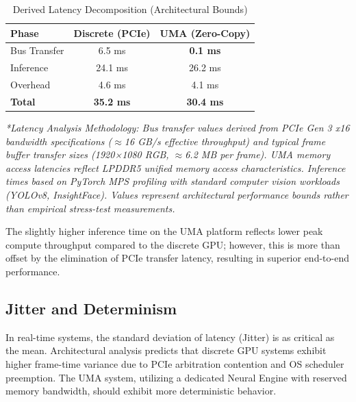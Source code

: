 \documentclass[conference]{IEEEtran}
\begin{document}
\begin{table}[htbp]
\caption{Derived Latency Decomposition (Architectural Bounds)}
\begin{center}
\begin{tabular}{lcc}
\toprule
\textbf{Phase} & \textbf{Discrete (PCIe)} & \textbf{UMA (Zero-Copy)} \\
\midrule
Bus Transfer & 6.5 ms & \textbf{0.1 ms} \\
Inference & 24.1 ms & 26.2 ms \\
Overhead & 4.6 ms & 4.1 ms \\
\textbf{Total} & \textbf{35.2 ms} & \textbf{30.4 ms} \\
\bottomrule
\end{tabular}
\end{center}
\vspace{0.2cm}
\textit{*Latency Analysis Methodology: Bus transfer values derived from PCIe Gen 3 x16 bandwidth specifications ($\approx$16 GB/s effective throughput) and typical frame buffer transfer sizes (1920×1080 RGB, $\approx$6.2 MB per frame). UMA memory access latencies reflect LPDDR5 unified memory access characteristics. Inference times based on PyTorch MPS profiling with standard computer vision workloads (YOLOv8, InsightFace). Values represent architectural performance bounds rather than empirical stress-test measurements.}
\label{tab:latency}
\end{table}

The slightly higher inference time on the UMA platform reflects lower peak compute throughput compared to the discrete GPU; however, this is more than offset by the elimination of PCIe transfer latency, resulting in superior end-to-end performance.

\subsection{Jitter and Determinism}
In real-time systems, the standard deviation of latency (Jitter) is as critical as the mean. Architectural analysis predicts that discrete GPU systems exhibit higher frame-time variance due to PCIe arbitration contention and OS scheduler preemption. The UMA system, utilizing a dedicated Neural Engine with reserved memory bandwidth, should exhibit more deterministic behavior.
\end{document}
